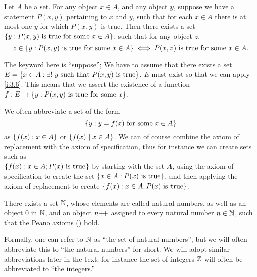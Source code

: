 \begin{ax}[Replacement]\label{i:3.6}
  Let \(A\) be a set.
  For any object \(x \in A\), and any object \(y\), suppose we have a statement \(P(x, y)\) pertaining to \(x\) and \(y\), such that for each \(x \in A\) there is at most one \(y\) for which \(P(x, y)\) is true.
  Then there exists a set \(\left\lbrace y : P(x, y) \text{ is true for some } x \in A\right\rbrace\), such that for any object \(z\),
  \[
    z \in \left\lbrace y: P(x, y) \text{ is true for some } x \in A\right\rbrace \iff P(x, z) \text{ is true for some } x \in A.
  \]
\end{ax}

\begin{note}
  The keyword here is ``suppose'';
  We have to assume that there exists a set \(E = \left\lbrace x \in A : \exists!\ y \text{ such that } P(x, y) \text{ is true}\right\rbrace\).
  \(E\) must exist so that we can apply \cref{i:3.6}.
  This means that we assert the existence of a function \(f : E \to \left\lbrace y : P(x, y) \text{ is true for some } x\right\rbrace\).
\end{note}

\begin{note}
  We often abbreviate a set of the form
  \[
    \left\lbrace y : y = f(x) \text{ for some } x \in A\right\rbrace
  \]
  as \(\left\lbrace f(x) : x \in A\right\rbrace\) or \(\left\lbrace f(x) \mid x \in A\right\rbrace\).
  We can of course combine the axiom of replacement with the axiom of specification, thus for instance we can create sets such as \\
  \(\left\lbrace f(x) : x \in A; P(x) \text{ is true}\right\rbrace\) by starting with the set \(A\), using the axiom of specification to create the set \(\left\lbrace x \in A : P(x) \text{ is true}\right\rbrace\), and then applying the axiom of replacement to create \(\left\lbrace f(x) : x \in A; P(x) \text{ is true}\right\rbrace\).
\end{note}

\begin{ax}[Infinity]\label{i:3.7}
  There exists a set \(\mathbb{N}\), whose elements are called natural numbers, as well as an object \(0\) in \(\mathbb{N}\), and an object \(n{+}\!{+}\) assigned to every natural number \(n \in \mathbb{N}\), such that the Peano axioms () hold.
\end{ax}

\begin{note}
  Formally, one can refer to \(\mathbb{N}\) as ``the set of natural numbers'', but we will often abbreviate this to ``the natural numbers'' for short.
  We will adopt similar abbreviations later in the text;
  for instance the set of integers \(\mathbb{Z}\) will often be abbreviated to ``the integers.''
\end{note}


